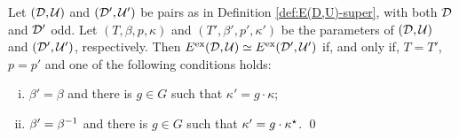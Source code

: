 \begin{thm}\label{thm:iso-D-odd-ExEsop}
    Let $(\mathcal{D}, \mathcal U)$ and $(\mathcal{D}', \mathcal U')$ be pairs as in Definition \ref{def:E(D,U)-super}, with both $\mathcal{D}$ and $\mathcal{D}'$ odd. 
    Let $(T, \beta, p, \kappa)$ and $(T', \beta', p', \kappa')$ be the parameters of $(\mathcal{D}, \mathcal U)$ and $(\mathcal{D}', \mathcal U')$, respectively. 
	Then $E^{\mathrm{ex}}(\mathcal{D}, \mathcal U) \simeq E^{\mathrm{ex}}(\mathcal{D}', \mathcal U')$ if, and only if, $T=T'$, $p = p'$ and one of the following conditions holds:
	\begin{enumerate}[(i)]
	    \item $\beta'=\beta$ and there is $g\in G$ such that $\kappa' = g \cdot \kappa$;
	    \item $\beta'=\beta^{-1}$ and there is $g\in G$ such that $\kappa' = g \cdot \kappa^\star$. \qed
	\end{enumerate}
\end{thm}
